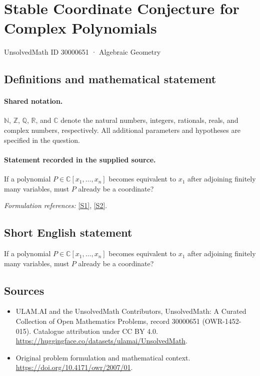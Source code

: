 \documentclass[11pt]{article}
\newcommand{\sref}[2]{\hyperlink{source:#1:#2}{[S#2]}}
\begin{document}
\setcounter{section}{30000650}
\section{Stable Coordinate Conjecture for Complex Polynomials}\label{30000651}
{\small UnsolvedMath ID 30000651 · Algebraic Geometry}
\subsection{Definitions and mathematical statement}

\paragraph{Shared notation.}$\mathbb N$, $\mathbb Z$, $\mathbb Q$, $\mathbb R$, and $\mathbb C$ denote the natural numbers, integers, rationals, reals, and complex numbers, respectively. All additional parameters and hypotheses are specified in the question.


\paragraph{Statement recorded in the supplied source.}
If a polynomial $P\in\mathbb{C}[x_1,\ldots,x_n]$ becomes equivalent to $x_1$ after adjoining finitely many variables, must $P$ already be a coordinate?
\par\smallskip\textit{Formulation references:} \sref{30000651}{1}, \sref{30000651}{2}.
\subsection{Short English statement}
If a polynomial $P\in\mathbb{C}[x_1,\ldots,x_n]$ becomes equivalent to $x_1$ after adjoining finitely many variables, must $P$ already be a coordinate?
\subsection{Sources}
\begin{itemize}
\item[\hypertarget{source:30000651:1}{S1}] ULAM.AI and the UnsolvedMath Contributors, UnsolvedMath: A Curated Collection of Open Mathematics Problems, record 30000651 (OWR-1452-015). Catalogue attribution under CC BY 4.0.
\url{https://huggingface.co/datasets/ulamai/UnsolvedMath}.
\item[\hypertarget{source:30000651:2}{S2}] Original problem formulation and mathematical context.
\url{https://doi.org/10.4171/owr/2007/01}.
\end{itemize}
\label{end:30000651}
\end{document}
